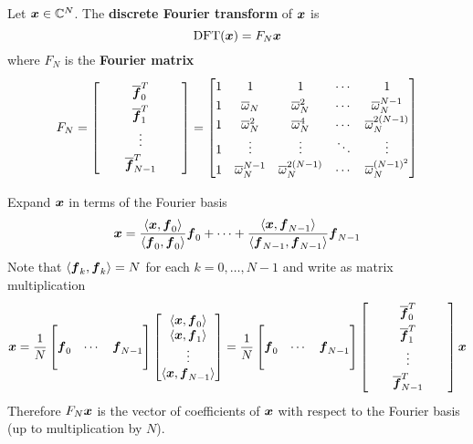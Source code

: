 \begin{definition}
Let $\boldsymbol{x} \in \mathbb{C}^N$. The {\bf discrete Fourier transform} of $\boldsymbol{x}$ is
$$
\mathrm{DFT}(\boldsymbol{x}) = F_N \boldsymbol{x}
$$
where $F_N$ is the {\bf Fourier matrix}
$$
\renewcommand{\arraystretch}{1.5}
F_N =
\begin{bmatrix} & & \overline{\bs{f}}^T_0 & & \\ & & \overline{\bs{f}}^T_1 & & \\ & & \vdots & & \\ & & \overline{\bs{f}}^T_{N-1} & & \end{bmatrix}
=
\renewcommand{\arraystretch}{1.25}
\begin{bmatrix}
1 & 1 & 1 & \cdots & 1 \\
1 & \overline{\omega}_N & \overline{\omega}_N^2 & \cdots & \overline{\omega}_N^{N-1} \\
1 & \overline{\omega}_N^2 & \overline{\omega}_N^4 & \cdots & \overline{\omega}_N^{2(N-1)} \\
1 & \vdots & \vdots & \ddots & \vdots \\
1 & \overline{\omega}_N^{N-1} & \overline{\omega}_N^{2(N-1)} & \cdots & \overline{\omega}_N^{(N-1)^2}
\end{bmatrix}
\renewcommand{\arraystretch}{1}
$$
\end{definition}

\begin{note}
Expand $\boldsymbol{x}$ in terms of the Fourier basis
$$
\boldsymbol{x} = \frac{\langle \boldsymbol{x} , \boldsymbol{f}_0 \rangle}{\langle \boldsymbol{f}_0 , \boldsymbol{f}_0 \rangle} \boldsymbol{f}_0 + \cdots + \frac{\langle \boldsymbol{x} , \boldsymbol{f}_{N-1} \rangle}{\langle \boldsymbol{f}_{N-1} , \boldsymbol{f}_{N-1} \rangle} \boldsymbol{f}_{N-1}
$$
Note that $\langle \boldsymbol{f}_k , \boldsymbol{f}_k \rangle = N$ for each $k=0,\dots,N-1$ and write as matrix multiplication
$$
\bs{x} = \frac{1}{N}
\begin{bmatrix} & & \\ \bs{f}_0 & \cdots & \bs{f}_{N-1} \\ & & \end{bmatrix}
\begin{bmatrix} \langle \bs{x} , \bs{f}_0 \rangle \\ \langle \bs{x} , \bs{f}_1 \rangle \\ \vdots \\ \langle \bs{x} , \bs{f}_{N-1} \rangle \end{bmatrix}
= \frac{1}{N} 
\begin{bmatrix} & & \\ \bs{f}_0 & \cdots & \bs{f}_{N-1} \\ & & \end{bmatrix}
\renewcommand{\arraystretch}{1.5}
\begin{bmatrix} & & \overline{\bs{f}}^T_0 & & \\ & & \overline{\bs{f}}^T_1 & & \\ & & \vdots & & \\ & & \overline{\bs{f}}^T_{N-1} & & \end{bmatrix}
\renewcommand{\arraystretch}{1}
\bs{x}
$$
Therefore $F_N \boldsymbol{x}$ is the vector of coefficients of $\boldsymbol{x}$ with respect to the Fourier basis (up to multiplication by $N$).
\end{note}

